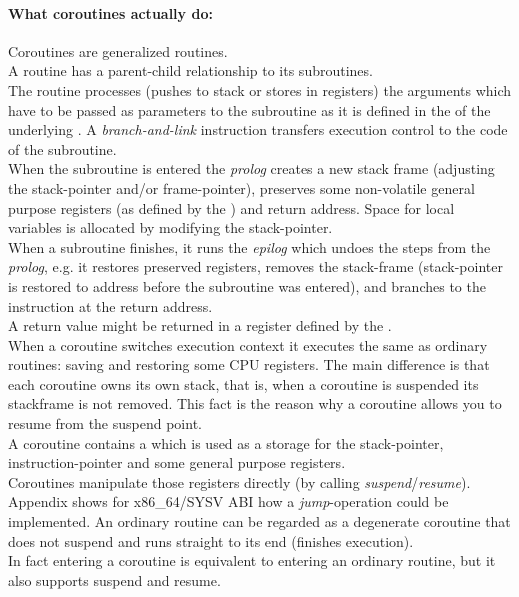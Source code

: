 \paragraph*{What coroutines actually do:}
Coroutines are generalized routines.\\
\newline
A routine has a parent-child relationship to its subroutines.\\
The routine processes (pushes to stack or stores in registers) the arguments which
have to be passed as parameters to the subroutine as it is defined in the \cv
of the underlying \ABI. A \textit{branch-and-link} instruction transfers
execution control to the code of the subroutine.\\
When the subroutine is entered the \textit{prolog} creates a new stack frame
(adjusting the stack-pointer and/or frame-pointer), preserves some
non-volatile general purpose registers (as defined by the \cv) and return
address. Space for local variables is allocated by modifying the
stack-pointer.\\
When a subroutine  finishes, it runs the \textit{epilog} which undoes the steps
from the \textit{prolog}, e.g. it restores preserved registers, removes the
stack-frame (stack-pointer is restored to address before the subroutine was entered),
and branches to the instruction at the return address.\\
A return value might be returned in a register defined by the \cv.\\
\newline
When a coroutine switches execution context it executes the same as
ordinary routines: saving and restoring some CPU registers. The main
difference is that each coroutine owns its own stack, that is, when a coroutine is
suspended its stackframe is not removed. This fact is the reason why a coroutine
allows you to resume from the suspend point.\\ A coroutine contains a
\cblock which is used as a storage for the stack-pointer, instruction-pointer and
some general purpose registers.\\ Coroutines manipulate those registers directly
(by calling \textit{suspend}/\textit{resume}).\\
Appendix  shows for x86\_64/SYSV ABI how a
\textit{jump}-operation could be implemented.
\newline
An ordinary routine can be regarded as a degenerate coroutine that
does not suspend and runs straight to its end (finishes execution).\\
\newline
In fact entering a coroutine is equivalent to entering an ordinary routine, but
it also supports suspend and resume.
